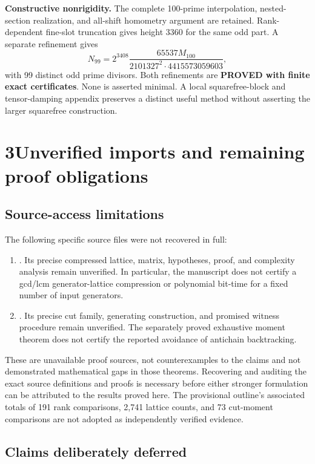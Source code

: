 \documentclass[10pt]{article}
\begin{document}
\textbf{Constructive nonrigidity.} The complete 100-prime interpolation, nested-section realization, and all-shift homometry argument are retained. Rank-dependent fine-slot truncation gives height 3360 for the same odd part. A separate refinement gives
\[
 N_{99}=2^{3408}\frac{65537M_{100}}{2101327^2\cdot4415573059603},
\]
with 99 distinct odd prime divisors. Both refinements are \textbf{PROVED with finite exact certificates}. None is asserted minimal. A local squarefree-block and tensor-damping appendix preserves a distinct useful method without asserting the larger squarefree construction.

\clearpage
\section*{3\quad Unverified imports and remaining proof obligations}

\subsection*{Source-access limitations}

The following specific source files were not recovered in full:
\begin{enumerate}
\item {}. Its precise compressed lattice, matrix, hypotheses, proof, and complexity analysis remain unverified. In particular, the manuscript does not certify a gcd/lcm generator-lattice compression or polynomial bit-time for a fixed number of input generators.
\item {}. Its precise cut family, generating construction, and promised witness procedure remain unverified. The separately proved exhaustive moment theorem does not certify the reported avoidance of antichain backtracking.
\end{enumerate}

These are unavailable proof sources, not counterexamples to the claims and not demonstrated mathematical gaps in those theorems. Recovering and auditing the exact source definitions and proofs is necessary before either stronger formulation can be attributed to the results proved here. The provisional outline's associated totals of 191 rank comparisons, 2,741 lattice counts, and 73 cut-moment comparisons are not adopted as independently verified evidence.

\subsection*{Claims deliberately deferred}
\end{document}
